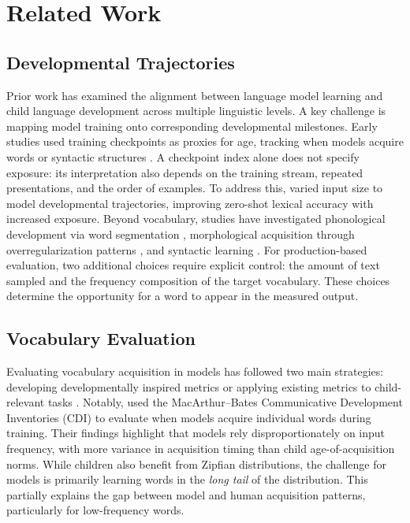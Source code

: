 


\section{Related Work}

\subsection{Developmental Trajectories}

Prior work has examined the alignment between language model learning and child language development across multiple linguistic levels. A key challenge is mapping model training onto corresponding developmental milestones. Early studies used training checkpoints as proxies for age, tracking when models acquire words \citep{chang2022word} or syntactic structures \citep{evanson2023language}. A checkpoint index alone does not specify exposure: its interpretation also depends on the training stream, repeated presentations, and the order of examples. To address this, \citet{lavechin2023babyslm} varied input size to model developmental trajectories, improving zero-shot lexical accuracy with increased exposure. Beyond vocabulary, studies have investigated phonological development via word segmentation \citep{goriely2024babble}, morphological acquisition through overregularization patterns \citep{haga2024modeling}, and syntactic learning \citep{evanson2023language}. For production-based evaluation, two additional choices require explicit control: the amount of text sampled and the frequency composition of the target vocabulary. These choices determine the opportunity for a word to appear in the measured output.

\subsection{Vocabulary Evaluation}

Evaluating vocabulary acquisition in models has followed two main strategies: developing developmentally inspired metrics or applying existing metrics to child-relevant tasks \citep{kosoy2023comparing,nikolaus2021evaluating,jiang2023mewl}. Notably, \citet{chang2022word} used the MacArthur--Bates Communicative Development Inventories (CDI) to evaluate when models acquire individual words during training. Their findings highlight that models rely disproportionately on input frequency, with more variance in acquisition timing than child age-of-acquisition norms. While children also benefit from Zipfian distributions, the challenge for models is primarily learning words in the \emph{long tail} of the distribution\citep{wolters2024zipfian,lavi2023zipfian,lavi2022learnability}. This partially explains the gap between model and human acquisition patterns, particularly for low-frequency words.


